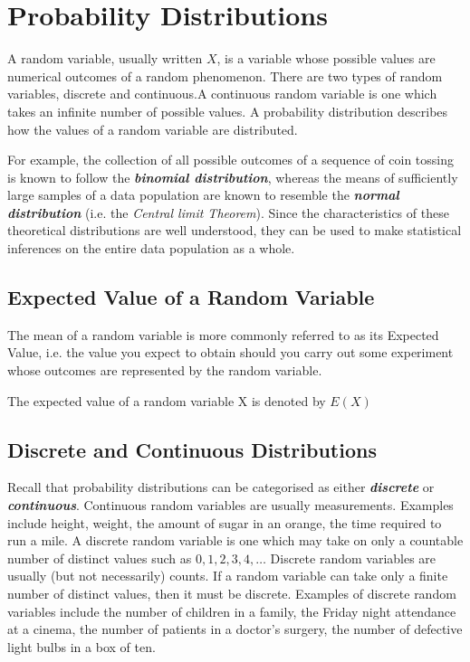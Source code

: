 \documentclass[a4paper,12pt]{article}
\begin{document}
\section{Probability Distributions}
A random variable, usually written $X$, is a variable whose possible values are numerical outcomes of a random phenomenon. There are two types of random variables, discrete and continuous.A continuous random variable is one which takes an infinite number of possible values.
A probability distribution describes how the values of a random variable are distributed. 

For example, the collection of all possible outcomes of a sequence of coin tossing is known to follow the \textit{\textbf{binomial distribution}}, whereas the means of sufficiently large samples of a data population are known to resemble the \textbf{\textit{normal distribution}} (i.e. the \textit{Central limit Theorem}). Since the characteristics of these theoretical distributions are well understood, they can be used to make statistical inferences on the entire data population as a whole.

\subsection{Expected Value of a Random Variable}
The mean of a random variable is more commonly referred to as its Expected Value, i.e. the value you expect to obtain should you carry out some experiment whose outcomes are represented by the random variable.

The expected value of a random variable X is denoted by $E(X)$


\subsection{Discrete and Continuous Distributions}
Recall that probability distributions can be categorised as either \textit{\textbf{discrete}} or \textit{\textbf{continuous}}.
 Continuous random variables are usually measurements. Examples include height, weight, the amount of sugar in an orange, the time required to run a mile. A discrete random variable is one which may take on only a countable number of distinct values such as $0,1,2,3,4,\ldots$ Discrete random variables are usually (but not necessarily) counts. If a random variable can take only a finite number of distinct values, then it must be discrete. Examples of discrete random variables include the number of children in a family, the Friday night attendance at a cinema, the number of patients in a doctor's surgery, the number of defective light bulbs in a box of ten.
 
\end{document}
